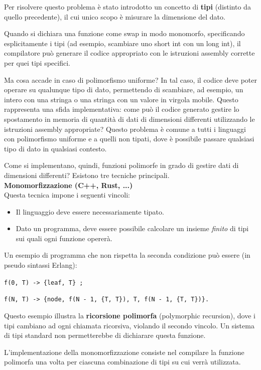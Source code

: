 \documentclass{article}
\begin{document}
Per risolvere questo problema è stato introdotto un concetto di \textbf{tipi} (distinto da quello precedente), il cui unico scopo è misurare la dimensione del dato.

Quando si dichiara una funzione come swap in modo monomorfo, specificando esplicitamente i tipi (ad esempio, scambiare uno short int con un long int), il compilatore può generare il codice appropriato con le istruzioni assembly corrette per quei tipi specifici.

Ma cosa accade in caso di polimorfismo uniforme? In tal caso, il codice deve poter operare su qualunque tipo di dato, permettendo di scambiare, ad esempio, un intero con una stringa o una stringa con un valore in virgola mobile. Questo rappresenta una sfida implementativa: come può il codice generato gestire lo spostamento in memoria di quantità di dati di dimensioni differenti utilizzando le istruzioni assembly appropriate? Questo problema è comune a tutti i linguaggi con polimorfismo uniforme e a quelli non tipati, dove è possibile passare qualsiasi tipo di dato in qualsiasi contesto.

Come si implementano, quindi, funzioni polimorfe in grado di gestire dati di dimensioni differenti? Esistono tre tecniche principali.\vspace{14pt}\\
\textbf{Monomorfizzazione (C++, Rust, ...)}\\
Questa tecnica impone i seguenti vincoli:
\begin{itemize}
    \item Il linguaggio deve essere necessariamente tipato.
    \item Dato un programma, deve essere possibile calcolare un insieme \textit{finito} di tipi sui quali ogni funzione opererà.
\end{itemize}
Un esempio di programma che non rispetta la seconda condizione può essere (in pseudo sintassi Erlang):

\texttt{f(0, T) -> \{leaf, T\} ;}

\texttt{f(N, T) -> \{node, f(N - 1, \{T, T\}), T, f(N - 1, \{T, T\})\}.}

Questo esempio illustra la \textbf{ricorsione polimorfa} (polymorphic recursion), dove i tipi cambiano ad ogni chiamata ricorsiva, violando il secondo vincolo. Un sistema di tipi standard non permetterebbe di dichiarare questa funzione.

L'implementazione della monomorfizzazione consiste nel compilare la funzione polimorfa una volta per ciascuna combinazione di tipi su cui verrà utilizzata.
\end{document}
